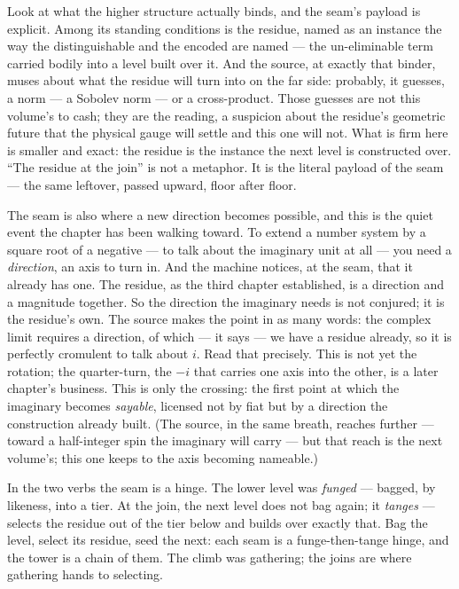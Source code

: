 Look at what the higher structure actually binds, and the seam's payload is explicit. Among its standing conditions is
the residue, named as an instance the way the distinguishable and the encoded are named --- the un-eliminable term
carried bodily into a level built over it. And the source, at exactly that binder, muses about what the residue will
turn into on the far side: probably, it guesses, a norm --- a Sobolev norm --- or a cross-product. Those guesses are
not this volume's to cash; they are the reading, a suspicion about the residue's geometric future that the physical
gauge will settle and this one will not. What is firm here is smaller and exact: the residue is the instance the next
level is constructed over. ``The residue at the join'' is not a metaphor. It is the literal payload of the seam --- the
same leftover, passed upward, floor after floor.

The seam is also where a new direction becomes possible, and this is the quiet event the chapter has been walking
toward. To extend a number system by a square root of a negative --- to talk about the imaginary unit at all --- you
need a \emph{direction}, an axis to turn in. And the machine notices, at the seam, that it already has one. The
residue, as the third chapter established, is a direction and a magnitude together. So the direction the imaginary
needs is not conjured; it is the residue's own. The source makes the point in as many words: the complex limit
requires a direction, of which --- it says --- we have a residue already, so it is perfectly cromulent to talk about
\(i\). Read that precisely. This is not yet the rotation; the quarter-turn, the \(-i\) that carries one axis into the
other, is a later chapter's business. This is only the crossing: the first point at which the imaginary becomes
\emph{sayable}, licensed not by fiat but by a direction the construction already built. (The source, in the same
breath, reaches further --- toward a half-integer spin the imaginary will carry --- but that reach is the next
volume's; this one keeps to the axis becoming nameable.)

In the two verbs the seam is a hinge. The lower level was \emph{funged} --- bagged, by likeness, into a tier. At the
join, the next level does not bag again; it \emph{tanges} --- selects the residue out of the tier below and builds over
exactly that. Bag the level, select its residue, seed the next: each seam is a funge-then-tange hinge, and the tower is
a chain of them. The climb was gathering; the joins are where gathering hands to selecting.


